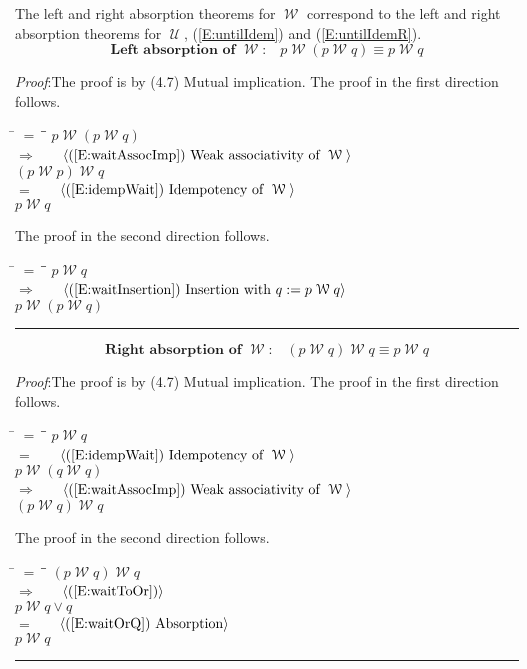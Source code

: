 \documentclass[12pt, fleqn, leqno]{article}
\newcommand{\lgap}{2pt}                             %
\newcommand{\mymathindent}{24pt}                    %
\newcommand{\impl}{\ensuremath{\Rightarrow}}        %
\newcommand{\Until}{\;\mathcal{U}\;}
\newcommand{\Wait}{\;\mathcal{W}\;}
\newcommand{\myqed}{\rule[-.23ex]{1.2ex}{2.0ex}}
\newcommand{\myqedtab}{\hspace{384pt}}              %
\newcommand{\Gll} {\langle}                         %
\newcommand{\Ggg} {\rangle}                         %
\newcommand{\Hint}[1]     {\ \ \ $\Gll              \mbox{#1} \Ggg$ }   %
\begin{document}
The left and right absorption theorems for $\Wait$ correspond to the left and right absorption theorems
for $\Until$, (\ref{E:untilIdem}) and (\ref{E:untilIdemR}).
\begin{equation}\label{E:waitAbsL}
\textbf{Left absorption of $\Wait$:}\quad p \Wait (p \Wait q) \equiv p \Wait q
\end{equation}

\emph{Proof}:The proof is by (4.7) Mutual implication.
The proof in the first direction follows.
\begin{tabbing}
\hspace{\mymathindent} \= $= \;$ \= \myqedtab \= \kill
  \> \>   $p \Wait (p \Wait q)$\\[\lgap]
  \> $\impl$  \>  \Hint{(\ref{E:waitAssocImp}) Weak associativity of $\Wait$}\\[\lgap]
  \> \>   $(p \Wait p) \Wait q$\\[\lgap]
  \> $=$  \>  \Hint{(\ref{E:idempWait}) Idempotency of $\Wait$}\\[\lgap]
  \> \>   $p \Wait q$
\end{tabbing}
The proof in the second direction follows.
\begin{tabbing}
\hspace{\mymathindent} \= $= \;$ \= \myqedtab \= \kill
  \> \>   $p \Wait q$\\[\lgap]
  \> $\impl$  \>  \Hint{(\ref{E:waitInsertion}) Insertion with $q := p \Wait q$}\\[\lgap]
  \> \>   $p \Wait (p \Wait q)$ \quad \myqed
\end{tabbing}
\begin{equation}\label{E:waitAbsR}
\textbf{Right absorption of $\Wait$:}\quad (p \Wait q) \Wait q \equiv p \Wait q
\end{equation}

\emph{Proof}:The proof is by (4.7) Mutual implication.
The proof in the first direction follows.
\begin{tabbing}
\hspace{\mymathindent} \= $= \;$ \= \myqedtab \= \kill
  \> \>   $p \Wait q$\\[\lgap]
  \> $=$  \>  \Hint{(\ref{E:idempWait}) Idempotency of $\Wait$}\\[\lgap]
  \> \>   $p \Wait (q \Wait q)$\\[\lgap]
  \> $\impl$  \>  \Hint{(\ref{E:waitAssocImp}) Weak associativity of $\Wait$}\\[\lgap]
  \> \>   $(p \Wait q) \Wait q$
\end{tabbing}
The proof in the second direction follows.
\begin{tabbing}
\hspace{\mymathindent} \= $= \;$ \= \myqedtab \= \kill
  \> \>   $(p \Wait q) \Wait q$\\[\lgap]
  \> $\impl$  \>  \Hint{(\ref{E:waitToOr})}\\[\lgap]
  \> \>   $p \Wait q \lor q$\\[\lgap]
  \> $=$  \>  \Hint{(\ref{E:waitOrQ}) Absorption}\\[\lgap]
  \> \>   $p \Wait q$ \quad \myqed
\end{tabbing}
\end{document}
